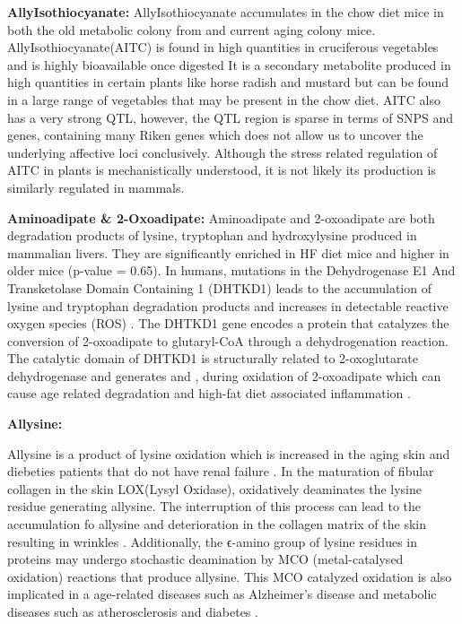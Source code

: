\documentclass[a4paper,11pt,twoside]{book}
\begin{document}
	\textbf{AllyIsothiocyanate:}
	AllyIsothiocyanate accumulates in the chow diet mice in both the old metabolic colony from \citep{Williams2016SystemsFunction} and current aging colony mice. AllyIsothiocyanate(AITC) is found in high quantities in cruciferous vegetables and is highly bioavailable once digested \citep{Zlatkis1971ProfileUrine.} It is a secondary metabolite produced in high quantities in certain plants like horse radish and mustard but can be found in a large range of vegetables that may be present in the chow diet. AITC also has a very strong QTL, however, the QTL region is sparse in terms of SNPS and genes, containing many Riken genes which does not allow us to uncover the underlying affective loci conclusively. Although the stress related regulation of AITC in plants is mechanistically understood, it is not likely its production is similarly regulated in mammals\citep{Kissen2016Allylisothiocyanate}.  
	
	\textbf{Aminoadipate \& 2-Oxoadipate:}
	Aminoadipate and 2-oxoadipate are both degradation products of lysine, tryptophan and hydroxylysine produced in mammalian livers\citep{Higashino1965Saccharopine}. They are significantly enriched in HF diet mice and higher in older mice (p-value = 0.65). In humans, mutations in the Dehydrogenase E1 And Transketolase Domain Containing 1 (DHTKD1) leads to the accumulation of lysine and tryptophan degradation products and increases in detectable reactive oxygen species (ROS) \citep{Goncalves2016Production}. The DHTKD1 gene encodes a protein that catalyzes the conversion of 2-oxoadipate to glutaryl-CoA through a dehydrogenation reaction. The catalytic domain of DHTKD1 is structurally related to 2-oxoglutarate dehydrogenase and generates  and , during oxidation of 2-oxoadipate which can cause age related degradation and high-fat diet associated inflammation \citep{Goncalves2016Production}. 
	
	\textbf{Allysine:}
	
	Allysine is a product of lysine oxidation which is increased in the aging skin and diebeties patients that do not have renal failure \citep{Sell20072aminoadipic}.  In the maturation of  fibular collagen in the skin LOX(Lysyl Oxidase),  oxidatively deaminates the lysine residue generating allysine. The interruption of this process can lead to the accumulation fo allysine and deterioration in the collagen matrix of the skin resulting in wrinkles \citep{Bailey1998Mechanisms}. Additionally,  the ϵ-amino group of lysine residues in proteins may undergo stochastic deamination by MCO (metal-catalysed oxidation) reactions  that produce allysine. This MCO catalyzed oxidation is also implicated in a age-related diseases such as  Alzheimer's disease and metabolic diseases such as atherosclerosis and diabetes \citep{Stadtman2004Role}. 
\end{document}
